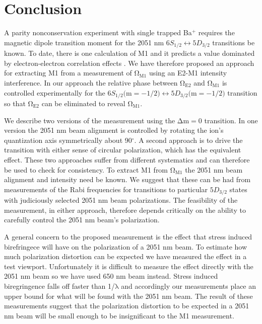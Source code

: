 \documentclass[%
 reprint,
 amsmath,amssymb,
 aps,
]{revtex4-1}
\begin{document}
\section{Conclusion}
A parity nonconservation experiment with single trapped Ba$^{+}$ requires the magnetic dipole transition moment for the 2051 nm $6S_{1/2} \leftrightarrow 5D_{3/2}$ transitions be known.  To date, there is one calculation of M1 and it predicts a value dominated by electron-electron correlation effects \cite{Sahoo06}.  We have therefore proposed an approach for extracting M1 from a measurement of $\mathrm{\Omega_{M1}}$ using an E2-M1 intensity interference.  In our approach the relative phase between $\mathrm{\Omega_{E2}}$ and $\mathrm{\Omega_{M1}}$ is controlled experimentally for the $6S_{1/2}\big( \mathrm{m}=-1/2\big) \leftrightarrow 5D_{3/2}\big( \mathrm{m}=-1/2\big)$ transition so that $\mathrm{\Omega_{E2}}$ can be eliminated to reveal $\mathrm{\Omega_{M1}}$. 

\indent We describe two versions of the measurement using the $\mathrm{\Delta m=0}$ transition.  In one version the 2051 nm beam alignment is controlled by rotating the ion's quantization axis symmetrically about 90$^{\circ}$.  A second approach is to drive the transition with either sense of circular polarization, which has the equivalent effect.  These two approaches suffer from different systematics and can therefore be used to check for consistency.  To extract M1 from $\mathrm{\Omega_{M1}}$ the 2051 nm beam alignment and intensity need be known.  We suggest that these can be had from measurements of the Rabi frequencies for transitions to particular $5D_{3/2}$ states with judiciously selected 2051 nm beam polarizations.  The feasibility of the measurement, in either approach, therefore depends critically on the ability to carefully control the 2051 nm beam's polarization.

\indent A general concern to the proposed measurement is the effect that stress induced birefringece will have on the polarization of a 2051 nm beam.  To estimate how much polarization distortion can be expected we have measured the effect in a test viewport.  Unfortunately it is difficult to measure the effect directly with the 2051 nm beam so we have used 650 nm beam instead.  Stress induced biregringence falls off faster than 1/$\mathrm{\lambda}$ and accordingly our measurements place an upper bound for what will be found with the 2051 nm beam.  The result of these measurements suggest that the polarization distortion to be expected in a 2051 nm beam will be small enough to be insignificant to the M1 measurement. \\
\end{document}
